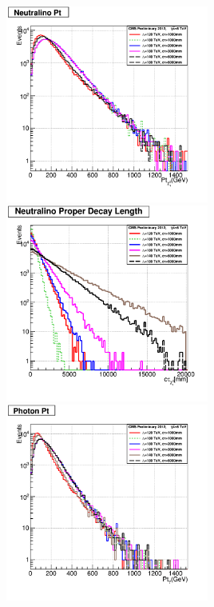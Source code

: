 \paragraph*{}\mbox{}\\
\begin{minipage}{\linewidth} 
\begin{center}
\mbox{\includegraphics[height=0.45\textwidth,width=0.5\textwidth]{THESISPLOTS/GMSB-SPS8-MODEL-Neutralinio-Pt.png} \hspace{-1cm}
\includegraphics[height=0.45\textwidth,width=0.5\textwidth]{THESISPLOTS/GMSB-SPS8-MODEL-Neutralino-Proper-DecayLength.png}} \\
\hspace{0.5cm}
\mbox{\includegraphics[height=0.45\textwidth,width=0.5\textwidth]{THESISPLOTS/GMSB-SPS8-MODEL-Photon-Pt.png} \hspace{-1cm}
}
\end{center}
\end{minipage}
